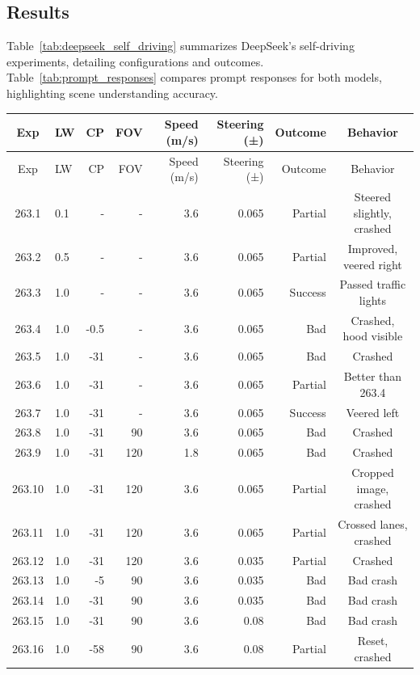 
\subsection{Results}
Table~\ref{tab:deepseek_self_driving} summarizes DeepSeek's self-driving experiments, detailing configurations and outcomes. Table~\ref{tab:prompt_responses} compares prompt responses for both models, highlighting scene understanding accuracy.

\begin{longtable}{@{}clrrrrrc@{}}
\toprule
Exp & LW & CP & FOV & Speed (m/s) & Steering (±) & Outcome & Behavior \\
\midrule
\endfirsthead
\toprule
Exp & LW & CP & FOV & Speed (m/s) & Steering (±) & Outcome & Behavior \\
\midrule
\endhead
263.1 & 0.1 & - & - & 3.6 & 0.065 & Partial & Steered slightly, crashed \\
263.2 & 0.5 & - & - & 3.6 & 0.065 & Partial & Improved, veered right \\
263.3 & 1.0 & - & - & 3.6 & 0.065 & Success & Passed traffic lights \\
263.4 & 1.0 & -0.5 & - & 3.6 & 0.065 & Bad & Crashed, hood visible \\
263.5 & 1.0 & -31 & - & 3.6 & 0.065 & Bad & Crashed \\
263.6 & 1.0 & -31 & - & 3.6 & 0.065 & Partial & Better than 263.4 \\
263.7 & 1.0 & -31 & - & 3.6 & 0.065 & Success & Veered left \\
263.8 & 1.0 & -31 & 90 & 3.6 & 0.065 & Bad & Crashed \\
263.9 & 1.0 & -31 & 120 & 1.8 & 0.065 & Bad & Crashed \\
263.10 & 1.0 & -31 & 120 & 3.6 & 0.065 & Partial & Cropped image, crashed \\
263.11 & 1.0 & -31 & 120 & 3.6 & 0.065 & Partial & Crossed lanes, crashed \\
263.12 & 1.0 & -31 & 120 & 3.6 & 0.035 & Partial & Crashed \\
263.13 & 1.0 & -5 & 90 & 3.6 & 0.035 & Bad & Bad crash \\
263.14 & 1.0 & -31 & 90 & 3.6 & 0.035 & Bad & Bad crash \\
263.15 & 1.0 & -31 & 90 & 3.6 & 0.08 & Bad & Bad crash \\
263.16 & 1.0 & -58 & 90 & 3.6 & 0.08 & Partial & Reset, crashed \\

\end{longtable}
